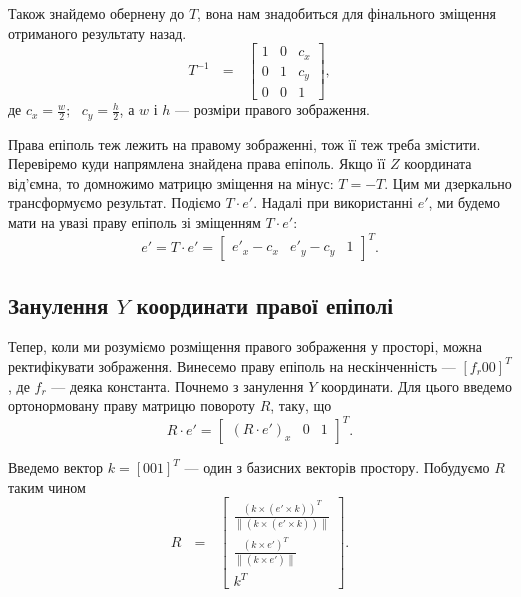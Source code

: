 Також знайдемо обернену до $T$, вона нам знадобиться для фінального зміщення
отриманого результату назад.
\begin{equation}
T^{-1} \:\:\: = \:\:\:\left[
\begin{matrix}
1 & 0 & c_x\\
0 & 1 & c_y\\
0 & 0 & 1\
\end{matrix}
\right],
\end{equation}
де $c_x = \frac{w}{2}; \:\:\: c_y = \frac{h}{2}$, а $w$ і $h$ --- розміри 
правого зображення.

Права епіполь теж лежить на правому зображенні, тож її теж треба змістити.
Перевіремо куди напрямлена знайдена права епіполь. Якщо її $Z$ координата
від'ємна, то домножимо матрицю зміщення на мінус: $T = -T$. Цим ми 
дзеркально трансформуємо результат. 
Подіємо $T \cdot e'$. Надалі при використанні $e'$, ми будемо мати на увазі 
праву епіполь зі зміщенням $T \cdot e'$:
\begin{equation}
e' = T \cdot e' = {
\begin{bmatrix}
e'_x - c_x & e'_y - c_y & 1
\end{bmatrix}
}^T.
\end{equation}


\subsection{Занулення $Y$ координати правої епіполі}
Тепер, коли ми розуміємо розміщення правого зображення у просторі, можна 
ректифікувати зображення. Винесемо праву епіполь на нескінченність --- 
${[f_r 0 0]}^T$, де $f_r$ --- деяка константа. Почнемо з занулення $Y$ 
координати. Для цього введемо ортонормовану праву матрицю повороту $R$, 
таку, що 
\begin{equation}
R \cdot e' = {
\begin{bmatrix}
(R \cdot e')_x & 0 & 1
\end{bmatrix}
}^T.
\end{equation}

Введемо вектор $k = {[0 0 1]}^T$ --- один з базисних векторів простору.
Побудуємо $R$ таким чином
\begin{equation}
R \:\:\: = \:\:\:\left[
\begin{matrix}
\frac{{(k \times (e' \times k))}^T}
{\left \| (k \times (e' \times k)) \right \|}\\
\frac{{(k \times e')}^T}{\left \| (k \times e') \right \|}\\
k^T\
\end{matrix}
\right].
\end{equation}

